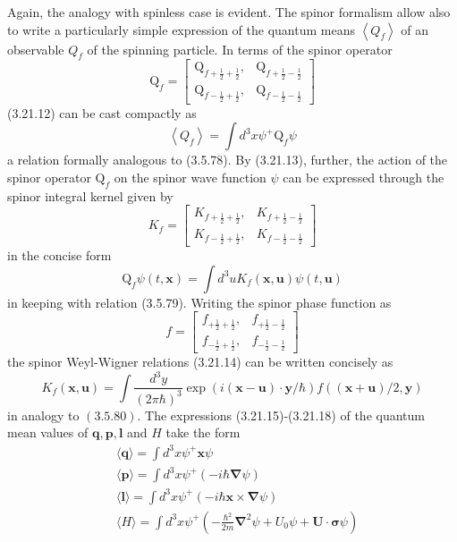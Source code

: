 \documentclass{article}
\begin{document}
Again, the analogy with spinless case is evident.
The spinor formalism allow also to write a particularly simple expression of the quantum means $\left\langle Q_{f}\right\rangle$ of an observable $Q_{f}$ of the spinning particle. In terms of the spinor operator
$$
\mathrm{Q}_{f}=\left[\begin{array}{ll}
\mathrm{Q}_{f+\frac{1}{2}+\frac{1}{2}}, & \mathrm{Q}_{f+\frac{1}{2}-\frac{1}{2}}  \tag{3.21.32}\\
\mathrm{Q}_{f-\frac{1}{2}+\frac{1}{2}}, & \mathrm{Q}_{f-\frac{1}{2}-\frac{1}{2}}
\end{array}\right]
$$
(3.21.12) can be cast compactly as
$$
\begin{equation*}
\left\langle Q_{f}\right\rangle=\int d^{3} x \psi^{+} \mathrm{Q}_{f} \psi \tag{3.21.33}
\end{equation*}
$$
a relation formally analogous to (3.5.78). By (3.21.13), further, the action of the spinor operator $\mathrm{Q}_{f}$ on the spinor wave function $\psi$ can be expressed through the spinor integral kernel given by
$$
K_{f}=\left[\begin{array}{ll}
K_{f+\frac{1}{2}+\frac{1}{2}}, & K_{f+\frac{1}{2}-\frac{1}{2}}  \tag{3.21.34}\\
K_{f-\frac{1}{2}+\frac{1}{2}}, & K_{f-\frac{1}{2}-\frac{1}{2}}
\end{array}\right]
$$
in the concise form
$$
\begin{equation*}
\mathrm{Q}_{f} \psi(t, \boldsymbol{x})=\int d^{3} u K_{f}(\boldsymbol{x}, \boldsymbol{u}) \psi(t, \boldsymbol{u}) \tag{3.21.35}
\end{equation*}
$$
in keeping with relation (3.5.79). Writing the spinor phase function as
$$
f=\left[\begin{array}{ll}
f_{+\frac{1}{2}+\frac{1}{2}}, & f_{+\frac{1}{2}-\frac{1}{2}}  \tag{3.21.36}\\
f_{-\frac{1}{2}+\frac{1}{2}}, & f_{-\frac{1}{2}-\frac{1}{2}}
\end{array}\right]
$$
the spinor Weyl-Wigner relations (3.21.14) can be written concisely as
$$
\begin{equation*}
K_{f}(\boldsymbol{x}, \boldsymbol{u})=\int \frac{d^{3} y}{(2 \pi \hbar)^{3}} \exp (i(\boldsymbol{x}-\boldsymbol{u}) \cdot \boldsymbol{y} / \hbar) f((\boldsymbol{x}+\boldsymbol{u}) / 2, \boldsymbol{y}) \tag{3.21.37}
\end{equation*}
$$
in analogy to $(3.5 .80)$.
The expressions (3.21.15)-(3.21.18) of the quantum mean values of $\boldsymbol{q}, \boldsymbol{p}, \boldsymbol{l}$ and $H$ take the form
$$
\begin{align*}
& \langle\boldsymbol{q}\rangle=\int d^{3} x \psi^{+} \boldsymbol{x} \psi  \tag{3.21.38}\\
& \langle\boldsymbol{p}\rangle=\int d^{3} x \psi^{+}(-i \hbar \boldsymbol{\nabla} \psi)  \tag{3.21.39}\\
& \langle\boldsymbol{l}\rangle=\int d^{3} x \psi^{+}(-i \hbar \boldsymbol{x} \times \boldsymbol{\nabla} \psi)  \tag{3.21.40}\\
& \langle H\rangle=\int d^{3} x \psi^{+}\left(-\frac{\hbar^{2}}{2 m} \boldsymbol{\nabla}^{2} \psi+U_{0} \psi+\boldsymbol{U} \cdot \boldsymbol{\sigma} \psi\right) \tag{3.21.41}
\end{align*}
$$
\end{document}
